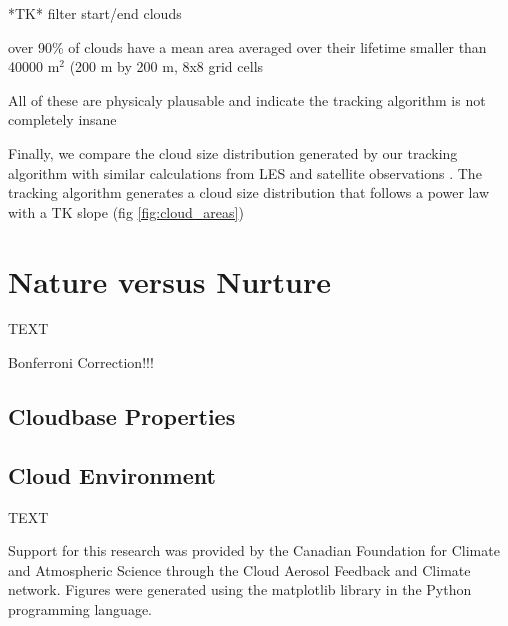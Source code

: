 \documentclass[acp]{copernicus}
\begin{document}
*TK* filter start/end clouds

over 90\% of clouds have a mean area averaged over their lifetime smaller than 
40000 m$^2$ (200 m by 200 m, 8x8 grid cells

All of these are physicaly plausable and indicate the tracking algorithm is not
completely insane

Finally, we compare the cloud size distribution generated by our tracking 
algorithm with similar calculations from LES \cite{TK} and satellite 
observations \cite{TK}.  The tracking algorithm generates a cloud size 
distribution that follows a power law with a TK slope (fig \ref{fig:cloud_areas})


\section{Nature versus Nurture}
TEXT

Bonferroni Correction!!!

\subsection{Cloudbase Properties}

\subsection{Cloud Environment}


\conclusions
TEXT




\begin{acknowledgements}
Support for this research was provided by the Canadian Foundation for Climate 
and Atmospheric Science through the Cloud Aerosol Feedback and Climate 
network.  Figures were generated using the matplotlib library in the Python
programming language.
\end{acknowledgements}
\end{document}
